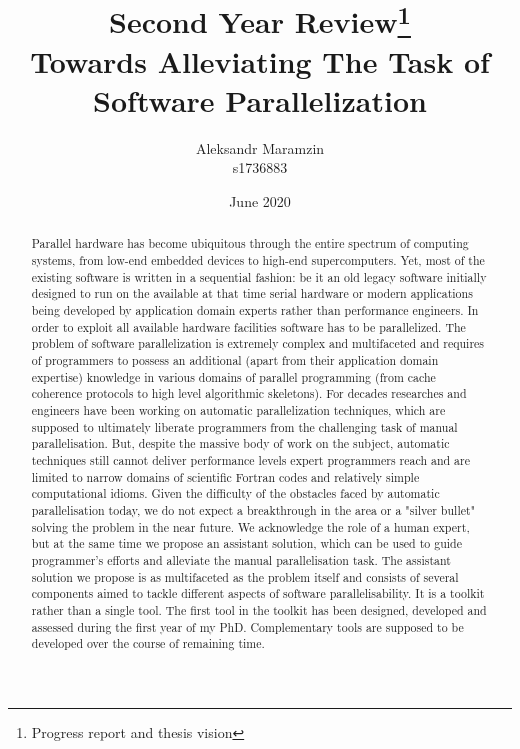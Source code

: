 \documentclass[10pt,a4paper]{report}
\title{\centering \textbf{Second Year Review\thanks{Progress report and thesis vision}}\\Towards Alleviating The Task of Software Parallelization}
\author{Aleksandr Maramzin\\s1736883}
\date{June 2020}
\begin{document}
\maketitle

\begin{abstract}


\quad Parallel hardware has become ubiquitous through the entire spectrum of computing systems, from low-end embedded devices to high-end supercomputers. Yet, most of the existing software is written in a sequential fashion: be it an old legacy software initially designed to run on the available at that time serial hardware or modern applications being developed by application domain experts rather than performance engineers. In order to exploit all available hardware facilities software has to be parallelized.\newline\null
\quad The problem of software parallelization is extremely complex and multifaceted and requires of programmers to possess an additional (apart from their application domain expertise) knowledge in various domains of parallel programming (from cache coherence protocols to high level algorithmic skeletons). For decades researches and engineers have been working on automatic parallelization techniques, which are supposed to ultimately liberate programmers from the challenging task of manual parallelisation. But, despite the massive body of work on the subject, automatic techniques still cannot deliver performance levels expert programmers reach and are limited to narrow domains of scientific Fortran codes and relatively simple computational idioms.\newline\null
\quad Given the difficulty of the obstacles faced by automatic parallelisation today, we do not expect a breakthrough in the area or a "silver bullet" solving the problem in the near future. We acknowledge the role of a human expert, but at the same time we propose an assistant solution, which can be used to guide programmer's efforts and alleviate the manual parallelisation task.\newline\null
\quad The assistant solution we propose is as multifaceted as the problem itself and consists of several components aimed to tackle different aspects of software parallelisability. It is a toolkit rather than a single tool. The first tool in the toolkit has been designed, developed and assessed during the first year of my PhD. Complementary tools are supposed to be developed over the course of remaining time.\newline\null

\end{abstract}
\end{document}
